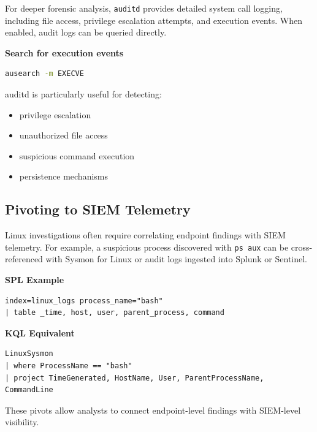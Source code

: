 For deeper forensic analysis, \texttt{auditd} provides detailed system call logging, including file access, privilege escalation 
attempts, and execution events. When enabled, audit logs can be queried directly.

\textbf{Search for execution events}

\begin{lstlisting}[language=bash]
ausearch -m EXECVE
\end{lstlisting}

auditd is particularly useful for detecting:

\begin{itemize}
    \item privilege escalation
    \item unauthorized file access
    \item suspicious command execution
    \item persistence mechanisms
\end{itemize}


\subsection*{Pivoting to SIEM Telemetry}

Linux investigations often require correlating endpoint findings with SIEM telemetry. 
For example, a suspicious process discovered with \texttt{ps aux} can be cross-referenced with Sysmon for Linux 
or audit logs ingested into Splunk or Sentinel.

\textbf{SPL Example}

\begin{lstlisting}
index=linux_logs process_name="bash"
| table _time, host, user, parent_process, command
\end{lstlisting}

\textbf{KQL Equivalent}

\begin{lstlisting}
LinuxSysmon
| where ProcessName == "bash"
| project TimeGenerated, HostName, User, ParentProcessName, CommandLine
\end{lstlisting}

These pivots allow analysts to connect endpoint-level findings with SIEM-level visibility.


